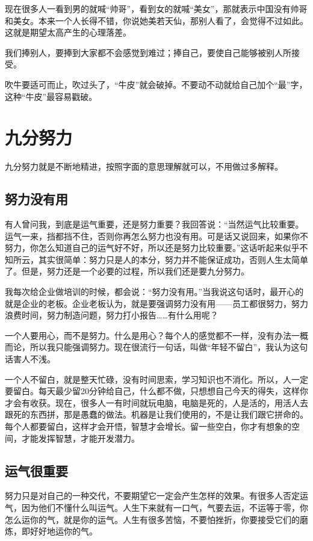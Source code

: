 \documentclass[fontset=fandol, a4paper, 12pt, openright]{ctexbook}
\begin{document}
现在很多人一看到男的就喊“帅哥”，看到女的就喊“美女”，那就表示中国没有帅哥和美女。本来一个人长得不错，你说她美若天仙，那别人看了，会觉得不过如此。这就是期望太高产生的心理落差。

我们捧别人，要捧到大家都不会感觉到难过；捧自己，要使自己能够被别人所接受。

吹牛要适可而止，吹过头了，“牛皮”就会破掉。不要动不动就给自己加个“最”字，这种“牛皮”最容易戳破。


\chapter{九分努力}
九分努力就是不断地精进，按照字面的意思理解就可以，不用做过多解释。

\section{努力没有用}

有人曾问我，到底是运气重要，还是努力重要？我回答说：“当然运气比较重要。运气一来，挡都挡不住，否则你再怎么努力也没有用。可是话又说回来，如果你不努力，你怎么知道自己的运气好不好，所以还是努力比较重要。”这话听起来似乎不知所云，其实很简单：努力只是人的本分，努力并不能保证成功，否则人生太简单了。但是，努力还是一个必要的过程，所以我们还是要九分努力。

我每次给企业做培训的时候，都会说：“努力没有用。”当我说这句话时，最开心的就是企业的老板。企业老板认为，就是要强调努力没有用——员工都很努力，努力浪费时间，努力制造问题，努力打小报告……有什么用呢？

一个人要用心，而不是努力。什么是用心？每个人的感觉都不一样，没有办法一概而论，所以我只能强调努力。现在很流行一句话，叫做“年轻不留白”，我认为这句话害人不浅。

一个人不留白，就是整天忙碌，没有时间思索，学习知识也不消化。所以，人一定要留白。每天最少留20分钟给自己，什么都不做，只想想自己今天的得失，这样你才会有收获。现在，很多人一有时间就玩电脑，电脑是死的，人是活的，用活人去跟死的东西拼，那是愚蠢的做法。机器是让我们使用的，不是让我们跟它拼命的。每个人都要留白，这样才会开悟，智慧才会增长。留一些空白，你才有想象的空间，才能发挥智慧，才能开发潜力。

\section{运气很重要}

努力只是对自己的一种交代，不要期望它一定会产生怎样的效果。有很多人否定运气，因为他们不懂什么叫运气。人生下来就有一口气，气要去运，不运等于零，你怎么运你的气，就是你的运气。人生有很多苦恼，不要怕挫折，你要接受它们的磨炼，即好好地运你的气。
\end{document}

